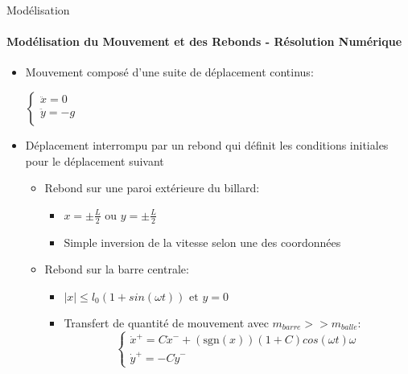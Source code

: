 \documentclass[draft]{beamer}
\begin{document}
  \begin{frame}{Modélisation}
  \framesubtitle{Modélisation du Mouvement et des Rebonds - Résolution Numérique}
  \begin{itemize}
    \item Mouvement composé d'une suite de déplacement continus:\\
    \pause \begin{center}
      \(\begin{cases}
        {\textstyle \ddot{x}=0}\\
        {\textstyle \ddot{y}=-g}\\
      \end{cases}\)
    \end{center}
    \pause \item Déplacement interrompu par un rebond qui définit les conditions initiales pour le déplacement suivant
    \begin{itemize}
      \pause \item Rebond sur une paroi extérieure du billard:
      \begin{itemize}
        \item \(x=\pm \frac{L}{2} \text{ ou } y=\pm \frac{L}{2}\)
        \item Simple inversion de la vitesse selon une des coordonnées 
      \end{itemize}
      \pause \item Rebond sur la barre centrale:
      \begin{itemize}
        \item \(\lvert x \rvert \leq l_0(1+sin(\omega t)) \text{ et } y=0\)
        \item Transfert de quantité de mouvement avec \({\scriptstyle m_{barre}>>m_{balle}}\):
        \[\begin{cases}
          \dot{x}^+=C\dot{x}^- +  (\text{sgn}(x))(1+C)cos(\omega t)\omega\\
          \dot{y}^+=-C \dot{y}^-
        \end{cases}\]
      \end{itemize}
    \end{itemize}
  \end{itemize}
  \end{frame}
\end{document}
